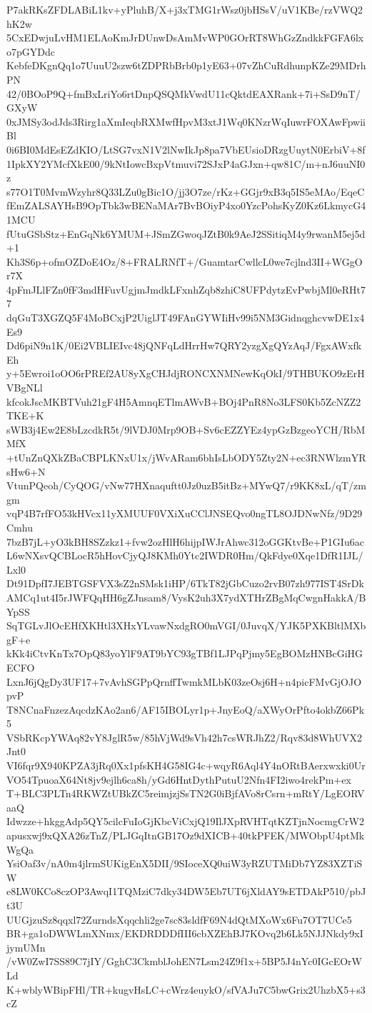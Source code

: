 P7akRKsZFDLABiL1kv+yPluhB/X+j3xTMG1rWsz0jbHSsV/uV1KBe/rzVWQ2hK2w
5CxEDwjuLvHM1ELAoKmJrDUnwDsAmMvWP0GOrRT8WhGzZndkkFGFA6lxo7pGYDdc
KebfeDKgnQq1o7UuuU2szw6tZDPRbBrb0p1yE63+07vZhCuRdhunpKZe29MDrhPN
42/0BOoP9Q+fmBxLriYo6rtDnpQSQMkVwdU11cQktdEAXRank+7i+SsD9nT/GXyW
0xJMSy3odJds3Rirg1aXmIeqbRXMwfHpvM3xtJ1Wq0KNzrWqIuwrFOXAwFpwiiBl
0i6BI0MdEsEZdKIO/LtSG7vxN1V2lNwIkJp8pa7VbEUsioDRzgUuytN0ErbiV+8f
1IpkXY2YMcfXkE00/9kNtIowcBxpVtmuvi72SJxP4aGJxn+qw81C/m+nJ6uuNI0z
s77O1T0MvmWzyhr8Q33LZu0gBic1O/jj3O7ze/rKz+GGjr9xB3q5IS5eMAo/EqeC
fEmZALSAYHsB9OpTbk3wBENaMAr7BvBOiyP4xo0YzcPohsKyZ0Kz6LkmycG41MCU
fUtuGSbStz+EnGqNk6YMUM+JSmZGwoqJZtB0k9AeJ2SSitiqM4y9rwanM5ej5d+1
Kh3S6p+ofmOZDoE4Oz/8+FRALRNfT+/GuamtarCwllcL0we7cjlnd3II+WGgOr7X
4pFmJLlFZn0fF3mdHFuvUgjmJmdkLFxnhZqb8zhiC8UFPdytzEvPwbjMl0eRHt77
dqGuT3XGZQ5F4MoBCxjP2UiglJT49FAnGYWIiHv99i5NM3GidnqghcvwDE1x4Es9
Dd6piN9n1K/0Ei2VBLIEIvc48jQNFqLdHrrHw7QRY2yzgXgQYzAqJ/FgxAWxfkEh
y+5Ewroi1oOO6rPREf2AU8yXgCHJdjRONCXNMNewKqOkI/9THBUKO9zErHVBgNLl
kfcokJscMKBTVuh21gF4H5AmnqETlmAWvB+BOj4PnR8No3LFS0Kb5ZcNZZ2TKE+K
sWB3j4Ew2E8bLzcdkR5t/9lVDJ0Mrp9OB+Sv6cEZZYEz4ypGzBzgeoYCH/RbMMfX
+tUnZnQXkZBaCBPLKNxU1x/jWvARam6bhIsLbODY5Zty2N+ec3RNWlzmYRsHw6+N
VtunPQeoh/CyQOG/vNw77HXnaquftt0Jz0uzB5itBz+MYwQ7/r9KK8xL/qT/zmgm
vqP4B7rfFO53kHVcx11yXMUUF0VXiXuCClJNSEQvo0ngTL8OJDNwNfz/9D29Cmhu
7bzB7jL+yO3kBH8SZzkz1+fvw2ozHlH6hijpIWJrAhwc312oGGKtvBe+P1GIu6ac
L6wNXsvQCBLocR5hHovCjyQJ8KMh0Ytc2IWDR0Hm/QkFdye0Xqe1DfR1IJL/Lxl0
Dt91DpfI7JEBTGSFVX3sZ2nSMsk1iHP/6TkT82jGbCuzo2rvB07zh977IST4SrDk
AMCq1ut4I5rJWFQqHH6gZJnsam8/VysK2uh3X7ydXTHrZBgMqCwgnHakkA/BYpSS
SqTGLvJlOcEHfXKHtl3XHxYLvawNxdgRO0mVGI/0JuvqX/YJK5PXKBltlMXbgF+e
kKk4iCtvKnTx7OpQ83yoYlF9AT9bYC93gTBf1LJPqPjmy5EgBOMzHNBcGiHGECFO
LxnJ6jQgDy3UF17+7vAvhSGPpQrnffTwmkMLbK03zeOsj6H+n4picFMvGjOJOpvP
T8NCnaFnzezAqcdzKAo2an6/AF15IBOLyr1p+JnyEoQ/aXWyOrPfto4okbZ66Pk5
VSbRKcpYWAq82vY8JglR5w/85hVjWd9sVh42h7csWRJhZ2/Rqv83d8WhUVX2Jnt0
VI6fqr9X940KPZA3jRq0Xx1pfsKH4G58IG4c+wqyR6Aql4Y4nORtBAerxwxki0Ur
VO54TpuoaX64Nt8jv9ejlh6ca8h/yGd6HntDythPutuU2Nfn4FI2iwo4rekPm+ex
T+BLC3PLTn4RKWZtUBkZC5reimjzjSsTN2G0iBjfAVo8rCsrn+mRtY/LgEORVaaQ
Idwzze+hkggAdp5QY5cilcFuIoGjKbcViCxjQ19IlJXpRVHTqtKZTjnNocmgCrW2
apusxwj9xQXA26zTnZ/PLJGqItnGB17Oz9dXICB+40tkPFEK/MWObpU4ptMkWgQa
YsiOaf3v/nA0m4jlrmSUKigEnX5DII/9SIoceXQ0uiW3yRZUTMiDb7YZ83XZTiSW
e8LW0KCo8czOP3AwqI1TQMziC7dky34DW5Eb7UT6jXldAY9sETDAkP510/pbJt3U
UUGjzuSz8qqxl72ZurndsXqqchli2ge7sc83sldfF69N4dQtMXoWx6Fu7OT7UCe5
BR+ga1oDWWLmXNmx/EKDRDDDfIII6cbXZEhBJ7KOvq2b6Lk5NJJNkdy9xIjymUMn
/vW0ZwI7SS89C7jIY/GghC3CkmblJohEN7Lsm24Z9f1x+5BP5J4nYc0IGcEOrWLd
K+wblyWBipFHl/TR+kugvHsLC+cWrz4euykO/sfVAJu7C5bwGrix2UhzbX5+s3cZ
